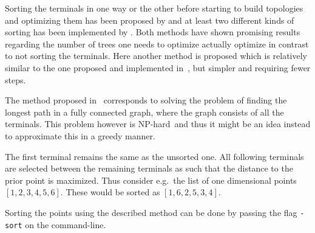 Sorting the terminals in one way or the other before starting to build
topologies and optimizing them has been proposed by \textcite{smith1992} and at
least two different kinds of sorting has been implemented by
\textcite{fonseca2014,vanlaarhoven2013}. Both methods have shown promising
results regarding the number of trees one needs to optimize actually optimize in
contrast to not sorting the terminals. Here another method is
proposed which is relatively similar to the one proposed and implemented
in~\cite{fonseca2014}, but simpler and requiring fewer steps.

The method proposed in~\cite{fonseca2014} corresponds to solving the problem of
finding the longest path in a fully connected graph, where the graph consists of
all the terminals. This problem however is NP-hard\missingref{}~and thus
it might be an idea instead to approximate this in a greedy manner.

The first terminal remains the same as the unsorted one. All following terminals
are selected between the remaining terminals as such that the distance to the
prior point is maximized. Thus consider e.g.\ the list of one dimensional points
$[1, 2, 3, 4, 5, 6]$. These would be sorted as $[1, 6, 2, 5, 3, 4]$.

Sorting the points using the described method can be done by passing the flag
\texttt{-sort} on the command-line.

